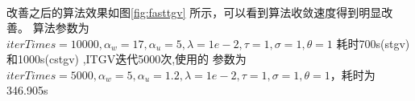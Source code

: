 \documentclass[UTF8]{ctexart}
\begin{document}
\begin{sloppypar}
\begin{algorithm}
\begin{algorithmic}
\begin{equation}
\begin{aligned}
                    \end{aligned}
                \end{equation}
            \end{algorithmic}
            \label{alg:TGVL2}
        \end{algorithm}
        改善之后的算法效果如图\ref{fig:fasttgv} 所示，可以看到算法收敛速度得到明显改善。
        算法参数为 $iterTimes = 10000, \alpha_w = 17, \alpha_u=5, \lambda = 1e-2,\tau = 1, \sigma = 1, \theta = 1$
        耗时700s(stgv)和1000s(cstgv) ,ITGV迭代5000次,使用的
        参数为$iterTimes = 5000, \alpha_w = 5, \alpha_u=1.2, \lambda = 1e-2,\tau = 1, \sigma = 1, \theta = 1$，耗时为346.905s
        \begin{figure}[htbp]
            \centering
            \quad
            \quad

\end{figure}
\end{sloppypar}
\end{document}
